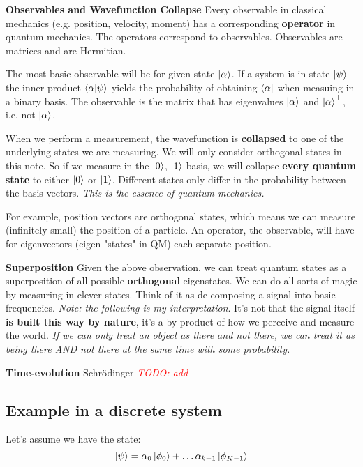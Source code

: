 \documentclass{article}
\newcommand{\comment}[1][]{#1} %
\newcommand{\todo}[1]{\comment{\textcolor{Red}{\textit{\lbrack TODO: #1 \rbrack}}}}
\begin{document}
\textbf{Observables and Wavefunction Collapse}
Every observable in classical mechanics (e.g. position, velocity, moment) has a corresponding \textbf{operator} in quantum mechanics. The operators correspond to observables. Observables are matrices and are Hermitian.
\vskip 0.15in

The most basic observable will be for given state $\ket{\alpha}$. If a system is in state $\ket{\psi}$ the inner product $\bra{\alpha}\ket{\psi}$ yields the probability of obtaining $\bra{\alpha}$ when measuing in a binary basis. The observable is the matrix that has eigenvalues $\ket{\alpha}$ and $\ket{\alpha}^\top$, i.e. not-$\ket{\alpha}$.

When we perform a measurement, the wavefunction is \textbf{collapsed} to one of the underlying states we are measuring. We will only consider orthogonal states in this note. So if we measure in the $\ket{0}$, $\ket{1}$ basis, we will collapse \textbf{every quantum state} to either $\ket{0}$ or $\ket{1}$. Different states only differ in the probability between the basis vectors. \textit{This is the essence of quantum mechanics.}

For example, position vectors are orthogonal states, which means we can measure (infinitely-small) the position of a particle. An operator, the observable, will have for eigenvectors (eigen-"states" in QM) each separate position.

\textbf{Superposition} Given the above observation, we can treat quantum states as a superposition of all possible \textbf{orthogonal} eigenstates. We can do all sorts of magic by measuring in clever states. Think of it as de-composing a signal into basic frequencies. \textit{Note: the following is my interpretation}. It's not that the signal itself \textbf{is built this way by nature}, it's a by-product of how we perceive and measure the world. \textit{If we can only treat an object as there and not there, we can treat it as being there AND not there at the same time with some probability.}

\textbf{Time-evolution} Schr{\"o}dinger \todo{add}

\subsection{Example in a discrete system}
Let's assume we have the state:
\begin{equation}
    \ket{\psi} = \alpha_0 \ket{\phi_0} + \dots \alpha_{k - 1} \ket{\phi_{K - 1}}
\end{equation}
\end{document}
